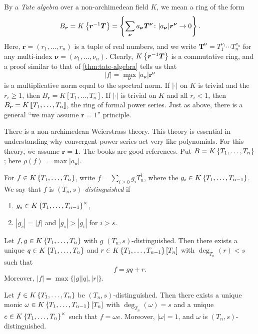 By a \emph{Tate algebra} over a non-archimedean field $K$, we mean a ring of 
the form 
\[
	B_{\bm r} = K\left\{ \bm r^{-1} \bm T \right\} = \left\{\sum_{\bm \nu} a_{\bm \nu} \bm T^{\bm \nu}\colon |a_{\bm \nu}| \bm r^{\bm \nu} \to 0\right\} .
\]
Here, $\bm r=(r_1,\dots,r_n)$ is a tuple of real numbers, and we write 
$\bm T^{\bm \nu} = T_1^{\nu_1} \dotsm T_n^{\nu_n}$ for any multi-index 
$\bm \nu=(\nu_1,\dots,\nu_n)$. Clearly, $K\left\{ \bm r^{-1} \bm T \right\}$ is a 
commutative ring, and a proof similar to that of \autoref{thm:tate-algebra} 
tells us that 
\[
	|f| = \max_{\bm\nu} |a_{\bm\nu}| \bm r^{\bm\nu}
\]
is a multiplicative norm equal to the spectral norm. If $|\cdot|$ on $K$ is 
trivial and the $r_i\geqslant 1$, then $B_{\bm r} = K[T_1,\dots,T_n]$. If 
$|\cdot|$ is trivial on $K$ and all $r_i<1$, then 
$B_{\bm r} = K\left\llbracket T_1,\dots,T_n\right\rrbracket$, the ring of formal power series. Just as 
above, there is a general ``we may assume $\bm r=1$'' principle. 

There is a non-archimedean Weierstrass theory. This theory is essential in 
understanding why convergent power series act very like polynomials. For this 
theory, we assume $\bm r=\bm 1$. The books \cite{bgr-1984,bosch-2014} are 
good references. Put $B=K\left\{ T_1,\dots,T_n \right\}$; here 
$\rho(f) = \max|a_{\bm \nu}|$. 

\begin{definition}
For $f\in K\left\{ T_1,\dots,T_n \right\}$, write $f=\sum_{i\geqslant 0} g_i T_n^i$, 
where the $g_i\in K\left\{ T_1,\dots,T_{n-1} \right\}$. We say that $f$ is 
\emph{$(T_n,s)$-distinguished} if 
\begin{enumerate}
\item
$g_s\in K\left\{ T_1,\dots,T_{n-1} \right\}^\times$, 

\item
$|g_s| = |f|$ and $|g_s| > |g_i|$ for $i>s$. 
\end{enumerate}
\end{definition}

\begin{theorem}
Let $f,g\in K\left\{ T_1,\dots,T_n \right\}$ with $g$ 
$(T_n,s)$-distinguished. Then there exists a unique 
$q\in K\left\{ T_1,\dots,T_n \right\}$ and $r\in K\left\{ T_1,\dots,T_{n-1} \right\}[T_n]$ with 
$\deg_{T_n}(r)<s$ such that 
\[
	f = g q+r .
\]
Moreover, $|f|=\max\{|g||q|,|r|\}$. 
\end{theorem}

\begin{theorem}
Let $f\in K\left\{ T_1,\dots,T_n \right\}$ be $(T_n,s)$-distinguished. Then there 
exists a unique monic $\omega\in K\left\{ T_1,\dots,T_{n-1} \right\}[T_n]$ with 
$\deg_{T_n}(\omega) = s$ and a unique $e\in K\left\{ T_1,\dots,T_n \right\}^\times$ 
such that $f=\omega e$. Moreover, $|\omega|=1$, and $\omega$ is 
$(T_n,s)$-distinguished. 
\end{theorem}
